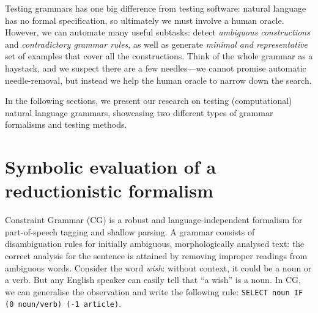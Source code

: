 


Testing grammars has one big difference from testing software: natural language has no formal specification, 
so ultimately we must involve a human oracle. However, we can automate many useful subtasks: detect \emph{ambiguous constructions} and \emph{contradictory grammar rules}, as well as generate \emph{minimal and representative} set of examples that cover all the constructions. 
Think of the whole grammar as a haystack, and we suspect there are a few needles---we cannot promise automatic needle-removal, but instead we help the human oracle to narrow down the search.

In the following sections, we present our research on testing (computational) natural language grammars, showcasing two different types of grammar formalisms and testing methods.

\section{Symbolic evaluation of a reductionistic formalism}

Constraint Grammar (CG) \cite{karlsson1995constraint} is a robust and language-independent formalism 
for part-of-speech tagging and shallow parsing. 
A grammar consists of disambiguation rules for initially ambiguous, 
morphologically analysed text: the correct analysis for the sentence 
is attained by removing improper readings from ambiguous words.
Consider the word \emph{wish}: without context, it could be a noun or a verb.
But any English speaker can easily tell that ``a wish'' is a noun.
In CG, we can generalise the observation and write the following rule: 
\texttt{SELECT noun IF (0 noun/verb) (-1 article)}.

